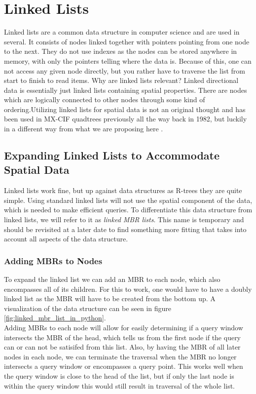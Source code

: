 \section{Linked Lists}
Linked lists are a common data structure in computer science and are used in several. It consists of nodes linked together with pointers pointing from one node to the next. They do not use indexes as the nodes can be stored anywhere in memory, with only the pointers telling where the data is. Because of this, one can not access any given node directly, but you rather have to traverse the list from start to finish to read items. Why are linked lists relevant? Linked directional data is essentially just linked lists containing spatial properties. There are nodes which are logically connected to other nodes through some kind of ordering.Utilizing linked lists for spatial data is not an original thought and has been used in MX-CIF quadtrees previously all the way back in 1982, but luckily in a different way from what we are proposing here \cite{spatial_data_structures}.

\subsection{Expanding Linked Lists to Accommodate Spatial Data}
Linked lists work fine, but up against data structures as R-trees they are quite simple. Using standard linked lists will not use the spatial component of the data, which is needed to make efficient queries. To differentiate this data structure from linked lists, we will refer to it as \textit{linked MBR lists}. This name is temporary and should be revisited at a later date to find something more fitting that takes into account all aspects of the data structure.

\subsubsection{Adding MBRs to Nodes}
To expand the linked list we can add an MBR to each node, which also encompasses all of its children. For this to work, one would have to have a doubly linked list as the MBR will have to be created from the bottom up. A visualization of the data structure can be seen in figure \ref{fig:linked_mbr_list_in_python}. \\

Adding MBRs to each node will allow for easily determining if a query window intersects the MBR of the head, which tells us from the first node if the query can or can not be satisifed from this list. Also, by having the MBR of all later nodes in each node, we can terminate the traversal when the MBR no longer intersects a query window or encompasses a query point. This works well when the query window is close to the head of the list, but if only the last node is within the query window this would still result in traversal of the whole list.

